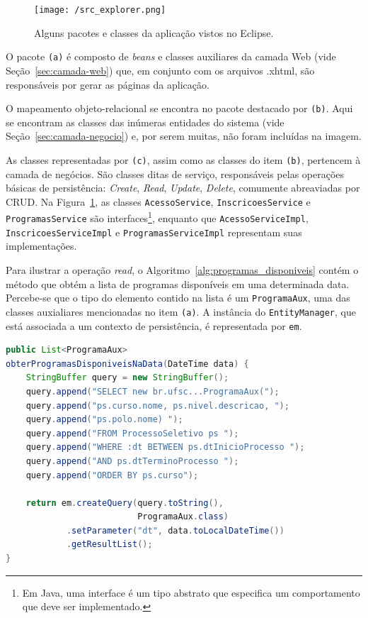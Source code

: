 \documentclass[
  10.5pt,				  %
	openright,			%
	twoside,			  %
  a5paper,
  chapter=TITLE,	%
	section=TITLE,	%
  hyphens,        %
	english,        %
	brazil          %
]{abntex2}
\begin{document}
\begin{figure}[!ht]
  \caption{\label{fig:src_explorer} Alguns pacotes e classes da aplicação vistos no Eclipse. }
  \begin{center}
    \texttt{[image: /src\_explorer.png]}
  \end{center}
\end{figure}

O pacote \texttt{(a)} é composto de \emph{beans} e classes auxiliares da camada Web (vide Seção~\ref{sec:camada-web}) que, em conjunto com os arquivos .xhtml, são responsáveis por gerar as páginas da aplicação.

O mapeamento objeto-relacional se encontra no pacote destacado por \texttt{(b)}. Aqui se encontram as classes das inúmeras entidades do sistema (vide Seção~\ref{sec:camada-negocio}) e, por serem muitas, não foram incluídas na imagem.

As classes representadas por \texttt{(c)}, assim como as classes do item \texttt{(b)}, pertencem à camada de negócios. São classes ditas de serviço, responsáveis pelas operações básicas de persistência: \emph{Create}, \emph{Read}, \emph{Update}, \emph{Delete}, comumente abreaviadas por CRUD. Na Figura~\ref{fig:src_explorer}, as classes \texttt{AcessoService}, \texttt{InscricoesService} e \texttt{ProgramasService} são interfaces\footnote{Em Java, uma interface é um tipo abstrato que especifica um comportamento que deve ser implementado.}, enquanto que \texttt{AcessoServiceImpl}, \texttt{InscricoesServiceImpl} e \texttt{ProgramasServiceImpl} representam suas implementações.



Para ilustrar a operação \emph{read}, o Algoritmo~\ref{alg:programas_disponiveis} contém o método que obtém a lista de programas disponíveis em uma determinada data. Percebe-se que o tipo do elemento contido na lista é um \texttt{ProgramaAux}, uma das classes auxialiares mencionadas no item \texttt{(a)}. A instância do \texttt{EntityManager}, que está associada a um contexto de persistência, é representada por \texttt{em}.


\begin{lstlisting}[language=java, caption={Obtenção da lista de programas disponíveis.}, label={alg:programas_disponiveis}]
public List<ProgramaAux>
obterProgramasDisponiveisNaData(DateTime data) {
    StringBuffer query = new StringBuffer();
    query.append("SELECT new br.ufsc...ProgramaAux(");
    query.append("ps.curso.nome, ps.nivel.descricao, ");
    query.append("ps.polo.nome) ");
    query.append("FROM ProcessoSeletivo ps ");
    query.append("WHERE :dt BETWEEN ps.dtInicioProcesso ");
    query.append("AND ps.dtTerminoProcesso ");
    query.append("ORDER BY ps.curso");

    return em.createQuery(query.toString(),
                          ProgramaAux.class)
            .setParameter("dt", data.toLocalDateTime())
            .getResultList();
}
\end{lstlisting}
%
\end{document}
